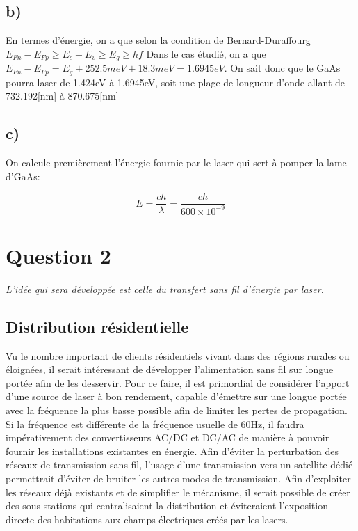 \section{b)}
En termes d'énergie, on a que selon la condition de Bernard-Duraffourg $E_{Fn} - E_{Fp} \geq E_c - E_v \geq E_g \geq hf$ Dans le cas étudié, on a que $E_{Fn} - E_{Fp} = E_g + 252.5meV + 18.3meV = 1.6945eV$. On sait donc que le GaAs pourra laser de 1.424eV à 1.6945eV, soit une plage de longueur d'onde allant de 732.192[nm] à 870.675[nm]

\section{c)}
On calcule premièrement l'énergie fournie par le laser qui sert à pomper la lame d'GaAs:

\begin{equation}
E = \frac{c h}{\lambda} = \frac{c h}{600 \times 10^{-9}}
\end{equation}


\chapter{Question 2}
\textit{L'idée qui sera développée est celle du transfert sans fil d'énergie par laser.}

\section{Distribution résidentielle} Vu le nombre important de clients résidentiels vivant dans des régions rurales ou éloignées, il serait intéressant de développer l’alimentation sans fil sur longue portée afin de les desservir.
Pour ce faire, il est primordial de considérer l’apport d’une source de laser à bon rendement, capable d’émettre sur une longue portée avec la fréquence la plus basse possible afin de limiter les pertes de propagation. Si la fréquence est différente de la fréquence usuelle de 60Hz, il faudra impérativement des convertisseurs AC/DC et DC/AC de manière à pouvoir fournir les installations existantes en énergie. Afin d’éviter la perturbation des réseaux de transmission sans fil, l’usage d’une transmission vers un satellite dédié permettrait d’éviter de bruiter les autres modes de transmission. Afin d’exploiter les réseaux déjà existants et de simplifier le mécanisme, il serait possible de créer des sous-stations qui centralisaient la distribution et éviteraient l’exposition directe des habitations aux champs électriques créés par les lasers.


